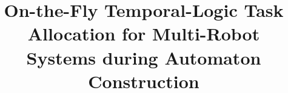 \documentclass[lettersize,journal]{IEEEtran}
\theoremstyle{italiclemma}
\theoremstyle{italiclemma}
\theoremstyle{definition}
\begin{document}
\title{On-the-Fly Temporal-Logic Task Allocation for Multi-Robot Systems during Automaton Construction}

\markboth{}{}

\maketitle
\end{document}
